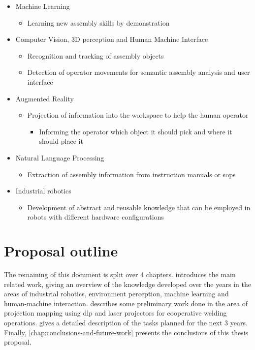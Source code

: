 \begin{itemize}
	\item Machine Learning
	\begin{itemize}
		\item Learning new assembly skills by demonstration
	\end{itemize}
	\item Computer Vision, 3D perception and Human Machine Interface
	\begin{itemize}
		\item Recognition and tracking of assembly objects
		\item Detection of operator movements for semantic assembly analysis and user interface
	\end{itemize}
	\item Augmented Reality
	\begin{itemize}
		\item Projection of information into the workspace to help the human operator
		\begin{itemize}
			\item Informing the operator which object it should pick and where it should place it
		\end{itemize}
	\end{itemize}
	\item Natural Language Processing
	\begin{itemize}
		\item Extraction of assembly information from instruction manuals or \glspl{sop}
	\end{itemize}
	\item Industrial robotics
	\begin{itemize}
		\item Development of abstract and reusable knowledge that can be employed in robots with different hardware configurations
	\end{itemize}
\end{itemize}



\section{Proposal outline}

The remaining of this document is split over 4 chapters.  introduces the main related work, giving an overview of the knowledge developed over the years in the areas of industrial robotics, environment perception, machine learning and human-machine interaction.  describes some preliminary work done in the area of projection mapping using \gls{dlp} and laser projectors for cooperative welding operations.  gives a detailed description of the tasks planned for the next 3 years. Finally, \cref{chap:conclusions-and-future-work} presents the conclusions of this thesis proposal.
